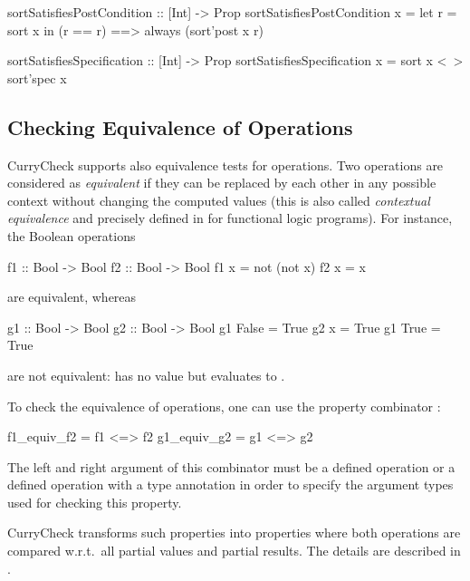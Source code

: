 \begin{curry}
sortSatisfiesPostCondition :: [Int] -> Prop
sortSatisfiesPostCondition x =
  let r = sort x
  in (r == r) ==> always (sort'post x r)

sortSatisfiesSpecification :: [Int] -> Prop
sortSatisfiesSpecification x = sort x <~> sort'spec x
\end{curry}

\subsection{Checking Equivalence of Operations}

CurryCheck supports also equivalence tests for operations.
Two operations are considered as \emph{equivalent} if they
can be replaced by each other in any possible context
without changing the computed values (this is also called
\emph{contextual equivalence} and precisely defined in
\cite{AntoyHanus12PADL} for functional logic programs).
For instance, the Boolean operations
\begin{curry}
f1 :: Bool -> Bool               f2 :: Bool -> Bool
f1 x = not (not x)                f2 x = x
\end{curry}
are equivalent, whereas
\begin{curry}
g1 :: Bool -> Bool               g2 :: Bool -> Bool
g1 False = True                   g2 x = True
g1 True  = True
\end{curry}
are not equivalent:  has no value but
 evaluates to .

To check the equivalence of operations, one can use the
property combinator \code{<=>}:
\begin{curry}
f1_equiv_f2 = f1 <=> f2
g1_equiv_g2 = g1 <=> g2
\end{curry}
The left and right argument of this combinator must be a defined operation
or a defined operation with a type annotation in order to specify
the argument types used for checking this property.

CurryCheck transforms such properties into properties
where both operations are compared w.r.t.\ all partial
values and partial results.
The details are described in \cite{AntoyHanus18FLOPS}.

